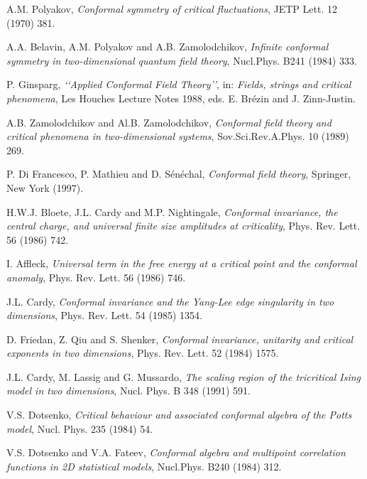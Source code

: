 \documentclass[a4paper,12pt]{report}
\begin{document}
\begin{thebibliography}{23}







 A.M. Polyakov, \textit{Conformal symmetry of critical fluctuations}, JETP Lett. 12 (1970) 381.

 A.A. Belavin, A.M. Polyakov and A.B. Zamolodchikov, \textit{Infinite conformal symmetry in two-dimensional quantum field theory}, Nucl.Phys. B241 (1984) 333.

 P. Ginsparg, \textit{\lq\lq Applied Conformal Field Theory\rq\rq}, in: \textit{Fields, strings and critical
phenomena}, Les Houches Lecture Notes 1988, eds. E. Br\'ezin and J. Zinn-Justin.

 A.B. Zamolodchikov and Al.B. Zamolodchikov, \textit{Conformal field theory and critical phenomena in two-dimensional systems}, Sov.Sci.Rev.A.Phys. 10 (1989) 269.

 P. Di Francesco, P. Mathieu and D. S\'en\'echal, \textit{Conformal field theory}, Springer, New York (1997).

 H.W.J. Bloete, J.L. Cardy and M.P. Nightingale, \textit{Conformal invariance, the central charge,
and universal finite size amplitudes at criticality}, Phys. Rev. Lett. 56 (1986) 742.

 I. Affleck, \textit{Universal term in the free energy at a critical point and the conformal anomaly},
Phys. Rev. Lett. 56 (1986) 746.

 J.L. Cardy, \textit{Conformal invariance and the Yang-Lee edge singularity in two dimensions}, Phys. Rev. Lett. 54 (1985) 1354.

 D. Friedan, Z. Qiu and S. Shenker, \textit{Conformal invariance, unitarity and critical
exponents in two dimensions}, Phys. Rev. Lett. 52 (1984) 1575.

 J.L. Cardy, M. Lassig and G. Mussardo, \textit{The scaling region of the tricritical Ising model in two dimensions}, Nucl. Phys. B 348 (1991) 591.

 V.S. Dotsenko, \textit{Critical behaviour and associated conformal algebra of the \coordHE{} Potts model}, Nucl. Phys. 235 (1984) 54.


 V.S. Dotsenko and V.A. Fateev, \textit{Conformal algebra and multipoint correlation functions in 2D statistical models}, Nucl.Phys. B240 (1984)
312.


\end{thebibliography}
\end{document}
